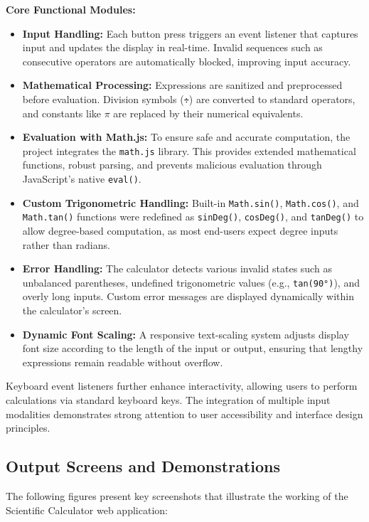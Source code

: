 \documentclass[a4paper,12pt,oneside]{report}
\numberwithin{equation}{chapter}
\numberwithin{figure}{chapter}
\numberwithin{table}{chapter}
\begin{document}
\textbf{Core Functional Modules:}
\begin{itemize}
    \item \textbf{Input Handling:} Each button press triggers an event listener that captures input and updates the display in real-time. Invalid sequences such as consecutive operators are automatically blocked, improving input accuracy.
    \item \textbf{Mathematical Processing:} Expressions are sanitized and preprocessed before evaluation. Division symbols (\texttt{÷}) are converted to standard operators, and constants like \(\pi\) are replaced by their numerical equivalents.

    \item \textbf{Evaluation with Math.js:} To ensure safe and accurate computation, the project integrates the \texttt{math.js} library. This provides extended mathematical functions, robust parsing, and prevents malicious evaluation through JavaScript’s native \texttt{eval()}.
    \item \textbf{Custom Trigonometric Handling:} Built-in \texttt{Math.sin()}, \texttt{Math.cos()}, and \texttt{Math.tan()} functions were redefined as \texttt{sinDeg()}, \texttt{cosDeg()}, and \texttt{tanDeg()} to allow degree-based computation, as most end-users expect degree inputs rather than radians.
    \item \textbf{Error Handling:} The calculator detects various invalid states such as unbalanced parentheses, undefined trigonometric values (e.g., \texttt{tan(90°)}), and overly long inputs. Custom error messages are displayed dynamically within the calculator’s screen.
    \item \textbf{Dynamic Font Scaling:} A responsive text-scaling system adjusts display font size according to the length of the input or output, ensuring that lengthy expressions remain readable without overflow.
\end{itemize}

Keyboard event listeners further enhance interactivity, allowing users to perform calculations via standard keyboard keys. The integration of multiple input modalities demonstrates strong attention to user accessibility and interface design principles.

\subsection{Output Screens and Demonstrations}

The following figures present key screenshots that illustrate the working of the Scientific Calculator web application:
\end{document}

